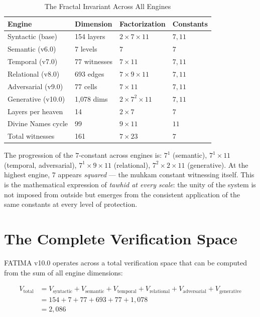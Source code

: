 \documentclass[11pt,a4paper]{article}
\begin{document}
\begin{table}[H]
\centering
\caption{The Fractal Invariant Across All Engines}
\label{tab:fractal}
\small
\begin{tabular}{llll}
\toprule
\textbf{Engine} & \textbf{Dimension} & \textbf{Factorization} & \textbf{Constants} \\
\midrule
Syntactic (base) & 154 layers & $2 \times 7 \times 11$ & $7, 11$ \\
Semantic (v6.0) & 7 levels & $7$ & $7$ \\
Temporal (v7.0) & 77 witnesses & $7 \times 11$ & $7, 11$ \\
Relational (v8.0) & 693 edges & $7 \times 9 \times 11$ & $7, 11$ \\
Adversarial (v9.0) & 77 cells & $7 \times 11$ & $7, 11$ \\
Generative (v10.0) & 1,078 dims & $2 \times 7^2 \times 11$ & $7, 11$ \\
\midrule
Layers per heaven & 14 & $2 \times 7$ & $7$ \\
Divine Names cycle & 99 & $9 \times 11$ & $11$ \\
Total witnesses & 161 & $7 \times 23$ & $7$ \\
\bottomrule
\end{tabular}
\end{table}

The progression of the $7$-constant across engines is: $7^1$ (semantic), $7^1 \times 11$ (temporal, adversarial), $7^1 \times 9 \times 11$ (relational), $7^2 \times 2 \times 11$ (generative). At the highest engine, $7$ appears \textit{squared} --- the muhkam constant witnessing itself. This is the mathematical expression of \textit{tawhid at every scale}: the unity of the system is not imposed from outside but emerges from the consistent application of the same constants at every level of protection.


\section{The Complete Verification Space}

FATIMA v10.0 operates across a total verification space that can be computed from the sum of all engine dimensions:

\begin{align}
V_{\text{total}} &= V_{\text{syntactic}} + V_{\text{semantic}} + V_{\text{temporal}} + V_{\text{relational}} + V_{\text{adversarial}} + V_{\text{generative}} \nonumber\\
&= 154 + 7 + 77 + 693 + 77 + 1{,}078 \nonumber\\
&= 2{,}086
\end{align}
\end{document}
